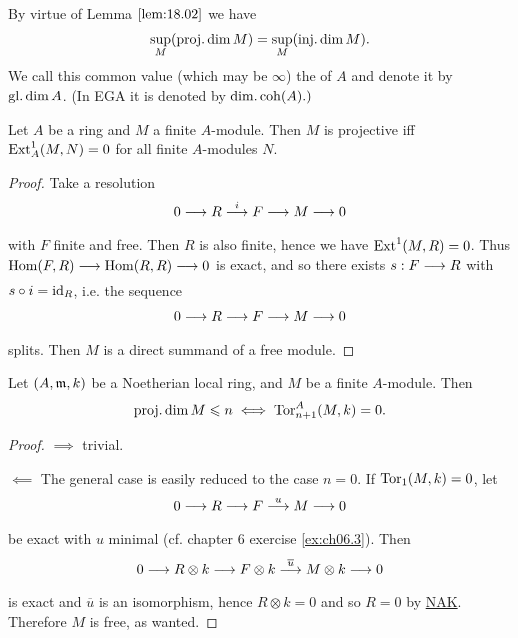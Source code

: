 \documentclass[../main]{subfiles}
\begin{document}
By virtue of Lemma $\ref{lem:18.02}$ we have \[\sup_M(\operatorname{proj. dim} M)=\sup_M(\operatorname{inj. dim} M).\] We call this common value (which may be $\infty$) the  of $A$ and denote it by $\operatorname{gl. dim} A$.\label{sym:gldim} (In EGA it is denoted by $\operatorname{dim.coh} (A).)$

\begin{parlemma}\label{lem:18.03}
Let $A$ be a  ring and $M$ a finite $A$-module. Then $M$ is projective iff $\operatorname{Ext}_A^1(M,N)=0$ for all finite $A$-modules $N$. 
\end{parlemma}
\begin{proof}
Take a resolution \[0 \varrightarrow{} R \varrightarrow{i} F \varrightarrow{} M \varrightarrow{} 0\] with $F$ finite and free. Then $R$ is also finite, hence we have $\operatorname{Ext}^1(M,R)=0$. Thus $\Hom(F,R) \varrightarrow{} \Hom(R,R)\varrightarrow{} 0$ is exact, and so there exists $s: F \varrightarrow{} R$ with $s \circ i=\operatorname{id}_R$, i.e. the sequence \[0 \varrightarrow{} R \varrightarrow{} F \varrightarrow{} M \varrightarrow{} 0\] splits. Then $M$ is a direct summand of a free module.
\end{proof}

\begin{lemma}\label{lem:18.04}
Let $(A,\mathfrak{m}, k)$ be a Noetherian local ring, and $M$ be a finite $A$-module. Then
\[\operatorname{proj. dim} M \leqslant n \iff \operatorname{Tor}_{n+1}^A(M,k)=0.\]
\end{lemma}

\begin{proof}
$\implies$ trivial.

$\impliedby$ The general case is easily reduced to the case $n=0$. If $\operatorname{Tor}_1(M,k)=0$, let \[0 \varrightarrow{} R \varrightarrow{} F \varrightarrow{u} M \varrightarrow{} 0\] be exact with $u$ minimal (cf. chapter 6 exercise \ref{ex:ch06.3}). Then \[0 \varrightarrow{} R \otimes k \varrightarrow{} F \otimes k \varrightarrow{\overline{u}} M \otimes k \varrightarrow{} 0\] is exact and $\overline{u}$ is an isomorphism, hence $R \otimes k=0$ and so $R=0$ by \hyperref[NAK]{NAK}. Therefore $M$ is free, as wanted.
\end{proof}
\end{document}
